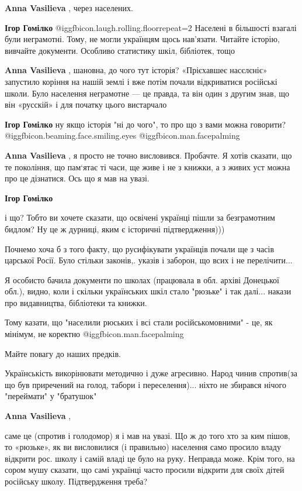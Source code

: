 \begin{itemize}
\begin{itemize}
\begin{itemize}
\textbf{Anna Vasilieva} , через населених.

\textbf{Ігор Гомілко}  @igg{fbicon.laugh.rolling.floor}{repeat=2} 
Населені в більшості взагалі були неграмотні. Тому, не могли українцям щось нав'язати. Читайте історію, вивчайте документи. Особливо статистику шкіл, бібліотек, тощо

\textbf{Anna Vasilieva} , шановна, до чого тут історія? «Прієхавшеє насєлєніє» запустило коріння на нашій землі і вже потім почали відкриватися російські школи.
Було населення неграмотне — це правда, та він один з другим знав, що він «русскій» і для початку цього вистарчало

\textbf{Ігор Гомілко} ну якщо історія "ні до чого", то про що з вами можна говорити?  @igg{fbicon.beaming.face.smiling.eyes}  @igg{fbicon.man.facepalming} 

\textbf{Anna Vasilieva} , я просто не точно висловився. Пробачте. Я хотів сказати, що те покоління, що пам‘ятає ті часи, ще живе і не з книжки, а з живих уст можна про це дізнатися. Ось що я мав на увазі.

\textbf{Ігор Гомілко} 

і що? Тобто ви хочете сказати, що освічені українці пішли за безграмотним
бидлом? Ну це ж дурниці, яким є історичні підтвердження)))

Почнемо хоча б з того факту, що русифікувати українців почали ще з часів
царської Росії. Було стільки законів,. указів і заборон, що всих і не
перелічити...

Я особисто бачила документи по школах (працювала в обл. архіві Донецької обл.),
видно, коли і скільки українських шкіл стало "рюзьке" і так далі... накази про
видавництва, бібліотеки та книжки.

Тому казати, що "населили рюських і всі стали російськомовними" - це, як мінімум, не коректно @igg{fbicon.man.facepalming} 

Майте повагу до наших предків.

Українськість викорінювати методично і дуже агресивно. Народ чинив спротив(за
що був приречений на голод, табори і переселення)... ніхто не збирався нічого
"переймати" у "братушок"

\textbf{Anna Vasilieva} , 

саме це (спротив і голодомор) я і мав на увазі. Що ж до того хто за ким пішов,
то «рюзьке», як ви висловилися (і правильно) населення само просило владу
відкрити рос. школу і самій владі це було на руку. Неправда може. Крім того, на
сором мушу сказати, що самі українці часто просили відкрити для своїх дітей
російську школу. Підтвердження треба?


\end{itemize}
\end{itemize}
\end{itemize}
